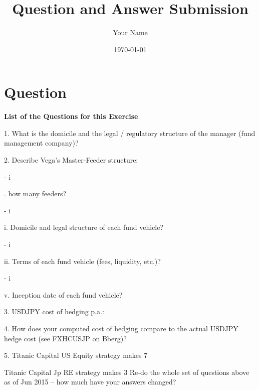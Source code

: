 \documentclass[12pt]{article}
\title{Question and Answer Submission}
\author{Your Name}
\date{\today}
\begin{document}
\newcommand{\SubItem}[1]{
    {\setlength\itemindent{15pt} \item[-] #1}
}
\maketitle %

\section*{Question}

\textbf{List of the Questions for this Exercise}
\begin{itemize}
    \item 1. What is the domicile and the legal / regulatory structure of the manager (fund management
company)?
    \item 2. Describe Vega’s Master-Feeder structure:
    \SubItem i. how many feeders?
    \SubItem ii. Domicile and legal structure of each fund vehicle?
    \SubItem iii. Terms of each fund vehicle (fees, liquidity, etc.)?
    \SubItem iv. Inception date of each fund vehicle?

    \item 3. USDJPY cost of hedging p.a.:
\item 4. How does your computed cost of hedging compare to the actual USDJPY hedge cost (see
FXHCUSJP on Bberg)?
\item 5. Titanic Capital US Equity strategy makes 7%
\item Titanic Capital Jp RE strategy makes 3%
Re-do the whole set of questions above as of Jun 2015 – how much have your answers changed?
\end{itemize}

\end{document}
